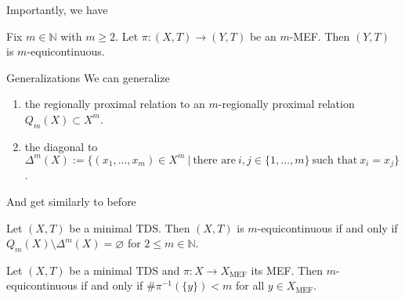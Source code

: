 \begin{frame}
    Importantly, we have
    \begin{proposition}
	    Fix $m \in \mathbb{N}$ with $m \geq 2$. Let $\pi : (X,T) \to (Y, T)$ be an $m$-MEF. Then $(Y, T)$ is $m$-equicontinuous.
    \end{proposition}
\end{frame}

\begin{frame}{Generalizations}
    We can generalize
    \begin{enumerate}
        \item the regionally proximal relation to an $m$-regionally proximal relation $Q_m(X) \subset X^{m}$.
        \item the diagonal to 
        $\Delta^m(X) := \{ (x_1, \dots, x_m) \in X^m \ | \ \text{there are} \ i, j \in \{1, \dots, m\} \ \text{such that} \ x_i = x_j \}$.
    \end{enumerate}

\end{frame}

\begin{frame}
    And get similarly to before
    \begin{theorem}
	    \label{thm:m-equiRelationChar}
	    Let $(X, T)$ be a minimal TDS.
	    Then $(X, T)$ is $m$-equicontinuous if and only if $Q_m(X) \setminus \Delta^m(X) = \varnothing$ for $2 \leq m \in \mathbb{N}$.
    \end{theorem}
    \pause
    \begin{corollary}
        Let $(X, T)$ be a minimal TDS and $\pi : X \to X_\text{MEF}$ its MEF.
        Then $m$-equicontinuous if and only if $\# \pi^{-1}(\{ y \}) < m$ for all $y \in X_\text{MEF}$.
    \end{corollary} 
\end{frame}